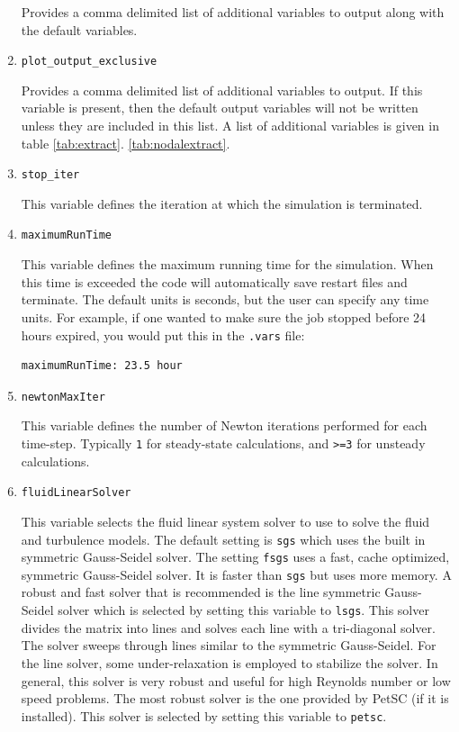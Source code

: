 \documentclass{article}
\begin{document}
\begin{enumerate}
  Provides a comma delimited list of additional variables to output
  along with the default variables.  

\item {\tt plot\_output\_exclusive}

  Provides a comma delimited list of additional variables to output.
  If this variable is present, then the default output variables will
  not be written unless they are included in this list.  A list of
  additional variables is given in table \ref{tab:extract}. %
  \ref{tab:nodalextract}.
  
\item {\tt stop\_iter}

  This variable defines the iteration at which the simulation is terminated.

\item {\tt maximumRunTime}

  This variable defines the maximum running time for the
  simulation.  When this time is exceeded the code will automatically
  save restart files and terminate.  The default units
  is seconds, but the user can specify any time units.  For
  example, if one wanted to make sure the job stopped before 24 hours
  expired, you would put this in the {\tt .vars} file:
\begin{verbatim}
maximumRunTime: 23.5 hour
\end{verbatim}

\item {\tt newtonMaxIter}
  
  This variable defines the number of Newton iterations performed
  for each time-step.  Typically {\tt 1} for steady-state calculations,
  and {\tt >=3} for unsteady calculations.

\item {\tt fluidLinearSolver }

  This variable selects the fluid linear system solver to use to solve
  the fluid and turbulence models.  The default setting is {\tt sgs}
  which uses the built in symmetric Gauss-Seidel solver.  The setting
  {\tt fsgs} uses a fast, cache optimized, symmetric Gauss-Seidel
  solver.  It is faster than {\tt sgs} but uses more memory.  A robust
  and fast solver that is recommended is the line symmetric
  Gauss-Seidel solver which is selected by setting this variable to
  {\tt lsgs}.  This solver divides the matrix into lines and solves
  each line with a tri-diagonal solver.  The solver sweeps through
  lines similar to the symmetric Gauss-Seidel.  For the line solver,
  some under-relaxation is employed to stabilize the solver.  In general,
  this solver is very robust and useful for high Reynolds number or
  low speed problems.  The most robust solver is the one provided by
  PetSC (if it is installed).  This solver is selected by setting this
  variable to {\tt petsc}.


\end{enumerate}
\end{document}
